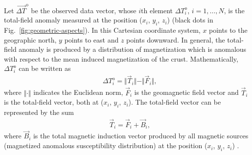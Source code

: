\documentclass[journal abbreviation, npg]{copernicus}
\begin{document}
Let $\vec{\Delta T}^\mathrm{o}$ be the observed data vector, whose $i$th
element $\Delta T^\mathrm{o}_{i}$, $i = 1, \ldots, N$, is the total-field
anomaly measured at the position ($x_{i}$, $y_{i}$, $z_{i}$) (black dots in
Fig.~\ref{fig:geometric-aspects}). In this Cartesian coordinate system, $x$
points to the geographic north, $y$ points to east and $z$ points downward.
In general, the total-field anomaly is produced by a distribution of 
magnetization which is anomalous with respect to the mean induced magnetization
of the crust. Mathematically, $\Delta T^\mathrm{o}_{i}$ can be
written as
\begin{align}
 &
\Delta T^\mathrm{o}_{i} = \Vert \vec{T}_i \Vert - \Vert \vec{F}_i \Vert ,
\label{eq:tfanomaly-i}
\end{align}
where $\Vert \cdot\Vert$ indicates the Euclidean norm, $\vec{F}_i$ is the
geomagnetic field vector and $\vec{T}_i$ is the total-field vector, both at
($x_{i}$, $y_{i}$, $z_{i}$). The total-field vector can be represented by the
sum
\begin{align}
 &
\vec{T}_i = \vec{F}_i + \vec{B}_i ,
\label{eq:tfvector-i}
\end{align}
where $\vec{B}_i$ is the total magnetic induction vector produced by all
magnetic sources (magnetized anomalous susceptibility distribution) at the
position ($x_{i}$, $y_{i}$, $z_{i}$) \citep{blakely1996,langel-hinze1998}.
\end{document}
